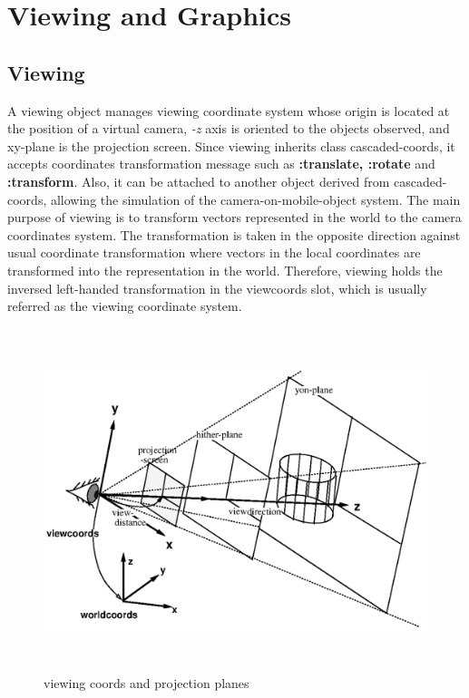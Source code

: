 \section{Viewing and Graphics}

\subsection{Viewing}
A viewing object manages viewing coordinate system
whose origin is located at the position of a virtual camera,
{\em -z} axis is oriented to the objects observed, and xy-plane is the
projection screen.
Since viewing inherits class cascaded-coords,
it accepts coordinates transformation message
such as {\bf :translate, :rotate} and {\bf :transform}.
Also, it can be attached to another object derived from cascaded-coords,
allowing the simulation of the camera-on-mobile-object system.
The main purpose of viewing is to transform vectors represented in the world
to the camera coordinates system.
The transformation is taken in the opposite direction against usual coordinate
transformation where vectors in the local coordinates are transformed into the
representation in the world.
Therefore, viewing holds the inversed left-handed transformation in
the viewcoords slot, which is usually referred as the viewing coordinate system.

\begin{figure}
\begin{center}
\includegraphics[height=10cm]{fig/viewcoords.ps}
\end{center}
\caption{viewing coords and projection planes}
\end{figure}


